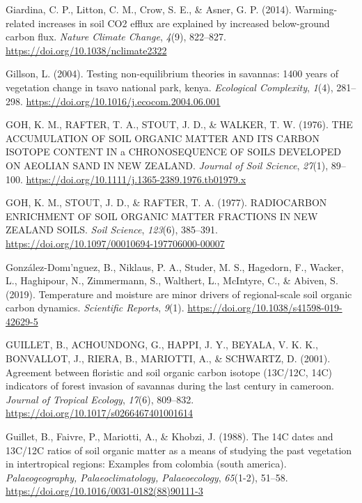 \documentclass[]{article}
\begin{document}
\leavevmode\hypertarget{ref-Giardina_2014}{}%
Giardina, C. P., Litton, C. M., Crow, S. E., \& Asner, G. P. (2014).
Warming-related increases in soil CO2 efflux are explained by increased
below-ground carbon flux. \emph{Nature Climate Change}, \emph{4}(9),
822--827. \url{https://doi.org/10.1038/nclimate2322}

\leavevmode\hypertarget{ref-Gillson_2004}{}%
Gillson, L. (2004). Testing non-equilibrium theories in savannas: 1400
years of vegetation change in tsavo national park, kenya.
\emph{Ecological Complexity}, \emph{1}(4), 281--298.
\url{https://doi.org/10.1016/j.ecocom.2004.06.001}

\leavevmode\hypertarget{ref-GOH_1976}{}%
GOH, K. M., RAFTER, T. A., STOUT, J. D., \& WALKER, T. W. (1976). THE
ACCUMULATION OF SOIL ORGANIC MATTER AND ITS CARBON ISOTOPE CONTENT IN a
CHRONOSEQUENCE OF SOILS DEVELOPED ON AEOLIAN SAND IN NEW ZEALAND.
\emph{Journal of Soil Science}, \emph{27}(1), 89--100.
\url{https://doi.org/10.1111/j.1365-2389.1976.tb01979.x}

\leavevmode\hypertarget{ref-GOH_1977}{}%
GOH, K. M., STOUT, J. D., \& RAFTER, T. A. (1977). RADIOCARBON
ENRICHMENT OF SOIL ORGANIC MATTER FRACTIONS IN NEW ZEALAND SOILS.
\emph{Soil Science}, \emph{123}(6), 385--391.
\url{https://doi.org/10.1097/00010694-197706000-00007}

\leavevmode\hypertarget{ref-Gonz_lez_Dom_nguez_2019}{}%
González-Domı'nguez, B., Niklaus, P. A., Studer, M. S., Hagedorn, F.,
Wacker, L., Haghipour, N., Zimmermann, S., Walthert, L., McIntyre, C.,
\& Abiven, S. (2019). Temperature and moisture are minor drivers of
regional-scale soil organic carbon dynamics. \emph{Scientific Reports},
\emph{9}(1). \url{https://doi.org/10.1038/s41598-019-42629-5}

\leavevmode\hypertarget{ref-GUILLET_2001}{}%
GUILLET, B., ACHOUNDONG, G., HAPPI, J. Y., BEYALA, V. K. K., BONVALLOT,
J., RIERA, B., MARIOTTI, A., \& SCHWARTZ, D. (2001). Agreement between
floristic and soil organic carbon isotope (13C/12C, 14C) indicators of
forest invasion of savannas during the last century in cameroon.
\emph{Journal of Tropical Ecology}, \emph{17}(6), 809--832.
\url{https://doi.org/10.1017/s0266467401001614}

\leavevmode\hypertarget{ref-Guillet_1988}{}%
Guillet, B., Faivre, P., Mariotti, A., \& Khobzi, J. (1988). The 14C
dates and 13C/12C ratios of soil organic matter as a means of studying
the past vegetation in intertropical regions: Examples from colombia
(south america). \emph{Palaeogeography, Palaeoclimatology,
Palaeoecology}, \emph{65}(1-2), 51--58.
\url{https://doi.org/10.1016/0031-0182(88)90111-3}
\end{document}
